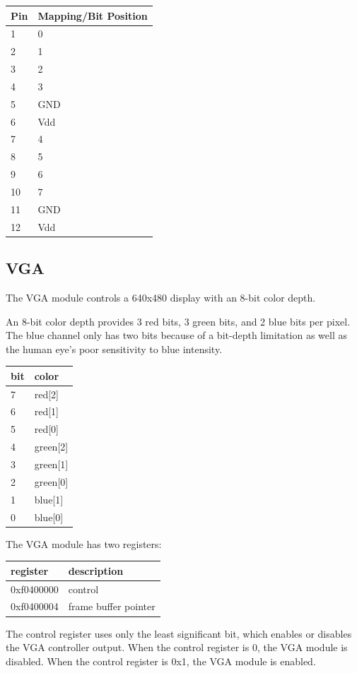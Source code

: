\documentclass{article}
\begin{document}
\begin{tabular}{ | l | l |}
\hline
Pin & Mapping/Bit Position \\
\hline
1 & 0 \\
2 & 1 \\
3 & 2 \\
4 &3 \\
5 & GND \\
6 & Vdd \\
7 & 4 \\
8 & 5 \\
9 & 6 \\
10 & 7 \\
11 & GND \\
12 & Vdd \\
\hline
\end{tabular}

\subsection{VGA}
The VGA module controls a 640x480 display with an 8-bit color depth.

An 8-bit color depth provides 3 red bits, 3 green bits, and 2 blue bits per pixel. The blue channel only has two bits because of a bit-depth limitation as well as the human eye's poor sensitivity to blue intensity. 

\begin{tabular}{ | l | l |}
\hline
bit & color \\
\hline
7 & red[2] \\
6 & red[1] \\
5 & red[0] \\ 
4 & green[2] \\
3 & green[1] \\
2 & green[0] \\
1 & blue[1] \\
0 & blue[0] \\
\hline
\end{tabular}

The VGA module has two registers: 

\begin{tabular}{ | l | l |}
\hline
register & description \\
\hline
0xf0400000 & control \\
0xf0400004 & frame buffer pointer \\
\hline
\end{tabular}

The control register uses only the least significant bit, which enables or disables the VGA controller output. When the control register is 0, the VGA module is disabled. When the control register is 0x1, the VGA module is enabled.
\end{document}
